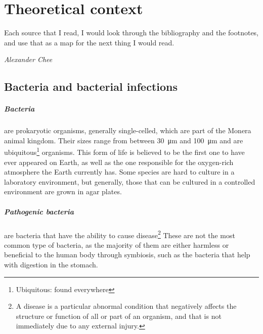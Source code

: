 \chapter{Theoretical context}
\epigraph{Each source that I read, I would look through the bibliography and the footnotes, and use that as a map for the next thing I would read.}{\textit{Alexander Chee}}
\section{Bacteria and bacterial infections}
\paragraph{Bacteria} are prokaryotic organisms, generally single-celled, which are part of the Monera animal kingdom. Their sizes range from between \SI{30}{\micro\metre} and \SI{100}{\micro\metre} and are ubiquitous\footnote{Ubiquitous: found everywhere} organisms. This form of life is believed to be the first one to have ever appeared on Earth, as well as the one responsible for the oxygen-rich atmosphere the Earth currently has. Some species are hard to culture in a laboratory environment, but generally, those that can be cultured in a controlled environment are grown in agar plates\cite{murrayMicrobiologiaMedica2013}. \newline
\paragraph{Pathogenic bacteria} are bacteria that have the ability to cause disease\footnote{A disease is a particular abnormal condition that negatively affects the structure or function of all or part of an organism, and that is not immediately due to any external injury\cite{DorlandsMedicalDictionary2010}.} These are not the most common type of bacteria, as the majority of them are either harmless or beneficial to the human body through symbiosis, such as the bacteria that help with digestion in the stomach\cite{murrayMicrobiologiaMedica2013}.

